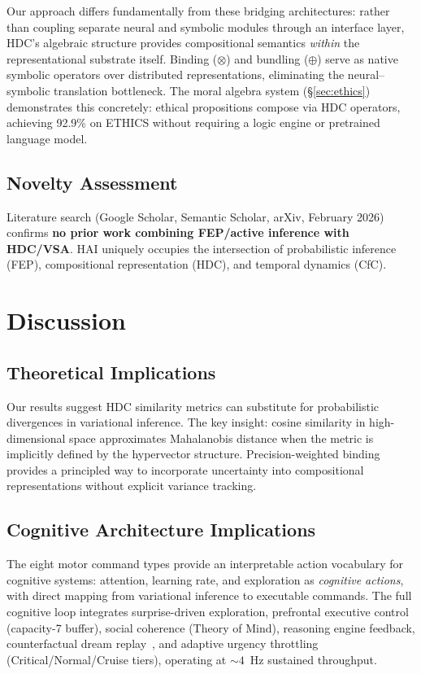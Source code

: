 \documentclass[10pt,letterpaper]{article}
\begin{document}
Our approach differs fundamentally from these bridging architectures: rather than coupling separate neural and symbolic modules through an interface layer, HDC's algebraic structure provides compositional semantics \emph{within} the representational substrate itself. Binding ($\otimes$) and bundling ($\oplus$) serve as native symbolic operators over distributed representations, eliminating the neural--symbolic translation bottleneck. The moral algebra system (\S\ref{sec:ethics}) demonstrates this concretely: ethical propositions compose via HDC operators, achieving 92.9\% on ETHICS without requiring a logic engine or pretrained language model.

\subsection{Novelty Assessment}

Literature search (Google Scholar, Semantic Scholar, arXiv, February 2026) confirms \textbf{no prior work combining FEP/active inference with HDC/VSA}. HAI uniquely occupies the intersection of probabilistic inference (FEP), compositional representation (HDC), and temporal dynamics (CfC).


\section{Discussion}

\subsection{Theoretical Implications}

Our results suggest HDC similarity metrics can substitute for probabilistic divergences in variational inference. The key insight: cosine similarity in high-dimensional space approximates Mahalanobis distance when the metric is implicitly defined by the hypervector structure. Precision-weighted binding provides a principled way to incorporate uncertainty into compositional representations without explicit variance tracking.

\subsection{Cognitive Architecture Implications}

The eight motor command types provide an interpretable action vocabulary for cognitive systems: attention, learning rate, and exploration as \emph{cognitive actions}, with direct mapping from variational inference to executable commands. The full cognitive loop integrates surprise-driven exploration, prefrontal executive control (capacity-7 buffer), social coherence (Theory of Mind), reasoning engine feedback, counterfactual dream replay~\cite{diekelmann2010memory}, and adaptive urgency throttling (Critical/Normal/Cruise tiers), operating at ${\sim}4$~Hz sustained throughput.
\end{document}
